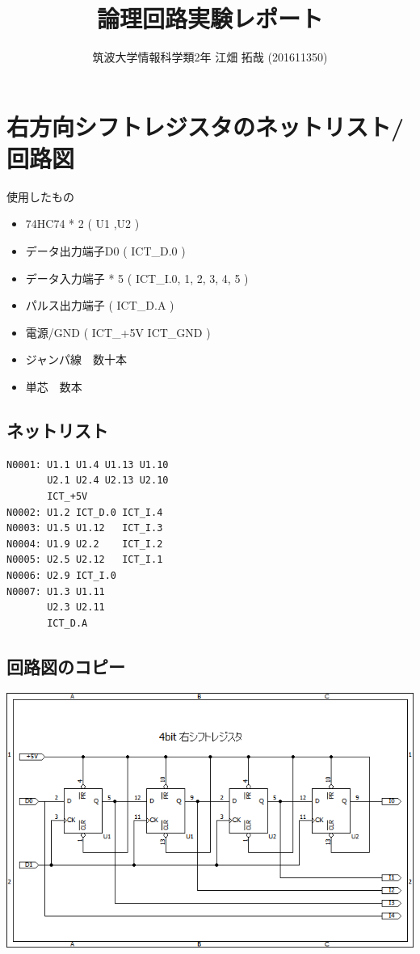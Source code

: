 \documentclass{scrartcl}
\author{筑波大学情報科学類2年 江畑 拓哉 (201611350)}
\date{}
\title{論理回路実験レポート}
\begin{document}
\maketitle
\section{右方向シフトレジスタのネットリスト/回路図}
\label{sec:orgf6d78de}
使用したもの\\
\begin{itemize}
\item 74HC74 * 2 ( U1 ,U2 )\\
\item データ出力端子D0 ( ICT\_D.0 )\\
\item データ入力端子 * 5   ( ICT\_I.0, 1, 2, 3, 4, 5 )\\
\item パルス出力端子 ( ICT\_D.A )\\
\item 電源/GND ( ICT\_+5V ICT\_GND )\\
\item ジャンパ線　数十本\\
\item 単芯　数本\\
\end{itemize}
\subsection{ネットリスト}
\label{sec:org1a4bc2c}

\begin{verbatim}
N0001: U1.1 U1.4 U1.13 U1.10
       U2.1 U2.4 U2.13 U2.10
       ICT_+5V
N0002: U1.2 ICT_D.0 ICT_I.4
N0003: U1.5 U1.12   ICT_I.3 
N0004: U1.9 U2.2    ICT_I.2
N0005: U2.5 U2.12   ICT_I.1
N0006: U2.9 ICT_I.0
N0007: U1.3 U1.11 
       U2.3 U2.11 
       ICT_D.A
\end{verbatim}
\subsection{回路図のコピー}
\label{sec:org26de43e}
\begin{center}
\includegraphics[width=15cm]{./logic.png}
\end{center}
\end{document}
